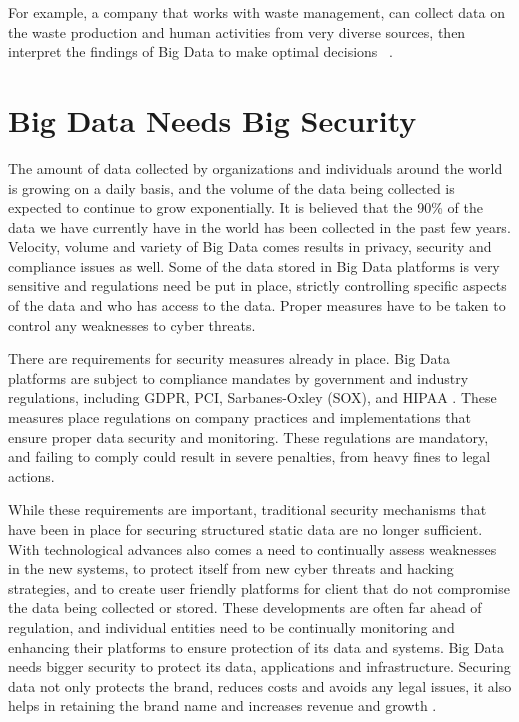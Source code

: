 \documentclass[sigconf]{acmart}
\begin{document}
For example, a company that works with waste management, can collect data on  the waste production and human activities from very diverse sources, then interpret the findings of Big Data  to make optimal decisions ~\cite{yenkar2014review}.

\section{Big Data Needs Big Security}
The amount of data collected by organizations and individuals around the world is growing on a daily basis, and the volume of the data being collected is expected to continue to grow exponentially.  It is believed that the 90\% of the data we have currently have in the world has been collected in the past few years. Velocity, volume and variety of Big Data comes results in privacy, security and compliance issues as well. Some of the data stored in Big Data platforms is very sensitive and  regulations need be put in place, strictly controlling specific aspects of the data and  who has access to the data. Proper measures have to be taken to control any weaknesses to cyber threats. 

There are requirements for security measures already in place. Big Data platforms are subject to compliance mandates by government and industry regulations, including GDPR, PCI, Sarbanes-Oxley (SOX), and HIPAA \cite{imperva}. These measures place regulations on company practices and implementations that ensure proper data security and monitoring. These regulations are mandatory, and failing to comply could result in severe penalties, from heavy fines to legal actions.

While these requirements are important, traditional security mechanisms that have been in place for securing structured static data are no longer sufficient. With technological advances also comes a need to continually assess weaknesses in the new systems, to protect itself from new cyber threats  and hacking strategies, and to create user friendly platforms for client that do not compromise the data being collected or stored. These developments are often far ahead of regulation, and individual entities need to be continually monitoring and enhancing their platforms to ensure protection of its data and systems.  Big Data needs bigger security to protect its data, applications and infrastructure. Securing data not only protects the brand, reduces costs and avoids any legal issues, it also helps in retaining the brand name and increases revenue and growth \cite{csasecurity}.
\end{document}
